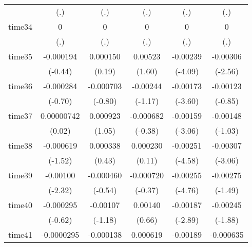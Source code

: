 \begin{table}[htbp]
\begin{tabular}{l*{5}{c}}
            &         (.)         &         (.)         &         (.)         &         (.)         &         (.)         \\
time34      &           0         &           0         &           0         &           0         &           0         \\
            &         (.)         &         (.)         &         (.)         &         (.)         &         (.)         \\
time35      &   -0.000194         &    0.000150         &     0.00523         &    -0.00239\sym{***}&    -0.00306\sym{*}  \\
            &     (-0.44)         &      (0.19)         &      (1.60)         &     (-4.09)         &     (-2.56)         \\
time36      &   -0.000284         &   -0.000703         &    -0.00244         &    -0.00173\sym{***}&    -0.00123         \\
            &     (-0.70)         &     (-0.80)         &     (-1.17)         &     (-3.60)         &     (-0.85)         \\
time37      &  0.00000742         &    0.000923         &   -0.000682         &    -0.00159\sym{**} &    -0.00148         \\
            &      (0.02)         &      (1.05)         &     (-0.38)         &     (-3.06)         &     (-1.03)         \\
time38      &   -0.000619         &    0.000338         &    0.000230         &    -0.00251\sym{***}&    -0.00307\sym{**} \\
            &     (-1.52)         &      (0.43)         &      (0.11)         &     (-4.58)         &     (-3.06)         \\
time39      &    -0.00100\sym{*}  &   -0.000460         &   -0.000720         &    -0.00255\sym{***}&    -0.00275         \\
            &     (-2.32)         &     (-0.54)         &     (-0.37)         &     (-4.76)         &     (-1.49)         \\
time40      &   -0.000295         &    -0.00107         &     0.00140         &    -0.00187\sym{**} &    -0.00245         \\
            &     (-0.62)         &     (-1.18)         &      (0.66)         &     (-2.89)         &     (-1.88)         \\
time41      &  -0.0000295         &   -0.000138         &    0.000619         &    -0.00189\sym{**} &   -0.000635         \\

\end{tabular}
\end{table}
